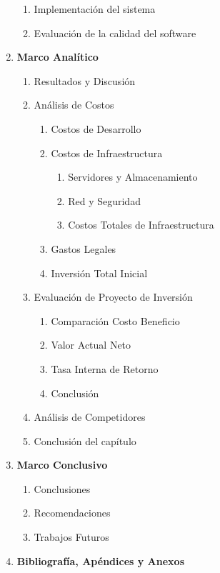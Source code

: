 \begin{enumerate}[label*=\arabic*.]
\begin{enumerate}[label*=\arabic*.]
            \item Implementación del sistema
            \item Evaluación de la calidad del software
        \end{enumerate}
    \item \textbf{Marco Analítico}
        \begin{enumerate}[label*=\arabic*.]
            \item Resultados y Discusión
            \item Análisis de Costos
                \begin{enumerate}[label*=\arabic*.]
                    \item Costos de Desarrollo
                    \item Costos de Infraestructura
                    \begin{enumerate}[label*=\arabic*.]
                        \item Servidores y Almacenamiento
                        \item Red y Seguridad
                        \item Costos Totales de Infraestructura
                    \end{enumerate}
                    \item Gastos Legales
                    \item Inversión Total Inicial
                \end{enumerate}
            \item Evaluación de Proyecto de Inversión
            \begin{enumerate}[label*=\arabic*.]
                \item Comparación Costo Beneficio
                \item Valor Actual Neto
                \item Tasa Interna de Retorno
                \item Conclusión
            \end{enumerate}
            \item Análisis de Competidores
            \item Conclusión del capítulo
        \end{enumerate}
    \item \textbf{Marco Conclusivo}
        \begin{enumerate}[label*=\arabic*.]
            \item Conclusiones
            \item Recomendaciones
            \item Trabajos Futuros
        \end{enumerate}
    \item \textbf{Bibliografía, Apéndices y Anexos}
\end{enumerate}
